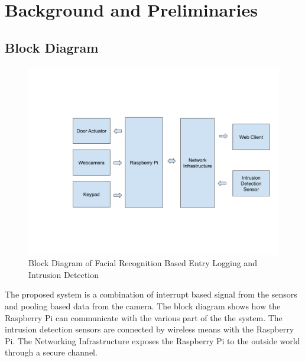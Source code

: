 \chapter{Background and Preliminaries}
\section{Block Diagram}
\begin{figure}[h!]
    \centering
    \includegraphics[width=13cm]{images/functional_block_diagram.png}
    \caption{Block Diagram of Facial Recognition Based Entry Logging and Intrusion Detection}
\end{figure}

\begin{flushleft}
    The proposed system is a combination of interrupt based signal from the sensors and pooling based data from the 
    camera. The block diagram shows how the Raspberry Pi can communicate with the various part of the the system. 
    The intrusion detection sensors are connected by wireless means with the Raspberry Pi. The Networking Infrastructure
    exposes the Raspberry Pi to the outside world through a secure channel.
\end{flushleft}

